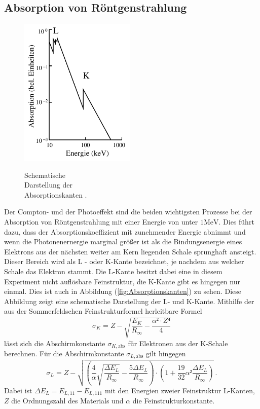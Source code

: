 \subsection{Absorption von Röntgenstrahlung}
\begin{figure}
    \begin{center}
        \label{fig:Absorptionskanten}
        \includegraphics[width=5.5cm]{content/Bilder/Kantenbild.jpeg}
        \caption[width=5.5cm]{Schematische \\ Darstellung der \\Absorptionskanten \cite{anleitungV602}.}
    \end{center}
    
    \label{fig:Kantenbild}
\end{figure}
Der Compton- und der Photoeffekt sind die beiden wichtigsten Prozesse bei der Absorption von Röntgenstrahlung mit einer Energie von unter $1 \si{\mega\electronvolt}$.
Dies führt dazu, dass der Absorptionskoeffizient mit zunehmender Energie abnimmt und wenn die Photonenernergie marginal größer ist als die Bindungsenergie eines 
Elektrons aus der nächsten weiter am Kern liegenden Schale sprunghaft ansteigt. Dieser Bereich wird als L - oder K-Kante bezeichnet, je nachdem aus welcher Schale das 
Elektron stammt. Die L-Kante besitzt dabei eine in diesem Experiment nicht auflösbare Feinstruktur, die K-Kante gibt es hingegen nur einmal. Dies ist auch in 
Abbildung (\ref{fig:Absorptionskanten}) zu sehen. Diese Abbildung zeigt eine schematische Darstellung der L- und K-Kante. 
Mithilfe der aus der Sommerfeldschen Feinstrukturformel herleitbare Formel 
\begin{equation}
    \sigma_K = Z - \sqrt{\frac{E_K}{R_{\infty}} - \frac{\alpha² \cdot Z⁴}{4}}
    \label{eqn:sigma_k}
\end{equation}
lässt sich die Abschirmkonstante $\sigma_{K,\text{abs}}$ für Elektronen aus der K-Schale berechnen. 
Für die Abschirmkonstante $\sigma_{L,\text{abs}}$ gilt hingegen 
\begin{equation}
    \sigma_L = Z - \sqrt{\left(\frac{4}{\alpha}\sqrt{\frac{\Delta E_L}{R_{\infty}}} - \frac{5 \Delta E_L}{R_{\infty}}\right) \cdot \left(1 + \frac{19}{32}\alpha² \frac{\Delta E_L}{R_{\infty}}\right)} \, .
    \label{eqn:sigma_l}
\end{equation}
Dabei ist $\Delta E_L = E_{L,11} - E_{L,111}$ mit den Energien zweier Feinstruktur L-Kanten, $Z$ die Ordnungszahl des Materials und $\alpha$ die Feinstrukturkonstante.
\FloatBarrier 

